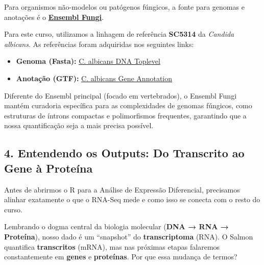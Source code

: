 \documentclass[
  letterpaper,
  DIV=11,
  numbers=noendperiod]{scrreprt}
\providecommand{\tightlist}{%
  \setlength{\itemsep}{0pt}\setlength{\parskip}{0pt}}
\begin{document}
Para organismos não-modelos ou patógenos fúngicos, a fonte para genomas
e anotações é o \href{https://fungi.ensembl.org/}{\textbf{Ensembl
Fungi}}.

Para este curso, utilizamos a linhagem de referência \textbf{SC5314} da
\emph{Candida albicans}. As referências foram adquiridas nos seguintes
links:

\begin{itemize}
\tightlist
\item
  \textbf{Genoma (Fasta):}
  \href{https://fungi.ensembl.org/Candida_albicans_sc5314_gca_000784655/Info/Index}{C.
  albicans DNA Toplevel}
\item
  \textbf{Anotação (GTF):}
  \href{https://fungi.ensembl.org/Candida_albicans_sc5314_gca_000784655/Info/Index}{C.
  albicans Gene Annotation}
\end{itemize}

\begin{tcolorbox}[enhanced jigsaw, arc=.35mm, bottomrule=.15mm, bottomtitle=1mm, breakable, colback=white, colbacktitle=quarto-callout-important-color!10!white, colframe=quarto-callout-important-color-frame, coltitle=black, left=2mm, leftrule=.75mm, opacityback=0, opacitybacktitle=0.6, rightrule=.15mm, title=\textcolor{quarto-callout-important-color}{\faExclamation}\hspace{0.5em}{Por que usar o Ensembl Fungi?}, titlerule=0mm, toprule=.15mm, toptitle=1mm]

Diferente do Ensembl principal (focado em vertebrados), o Ensembl Fungi
mantém curadoria específica para as complexidades de genomas fúngicos,
como estruturas de íntrons compactas e polimorfismos frequentes,
garantindo que a nossa quantificação seja a mais precisa possível.

\end{tcolorbox}

\subsection{4. Entendendo os Outputs: Do Transcrito ao Gene à
Proteína}\label{entendendo-os-outputs-do-transcrito-ao-gene-uxe0-proteuxedna}

Antes de abrirmos o R para a Análise de Expressão Diferencial,
precisamos alinhar exatamente o que o RNA-Seq mede e como isso se
conecta com o resto do curso.

Lembrando o dogma central da biologia molecular (\textbf{DNA → RNA →
Proteína}), nosso dado é um ``snapshot'' do \textbf{transcriptoma}
(RNA). O Salmon quantifica \textbf{transcritos} (mRNA), mas nas próximas
etapas falaremos constantemente em \textbf{genes} e \textbf{proteínas}.
Por que essa mudança de termos?
\end{document}

